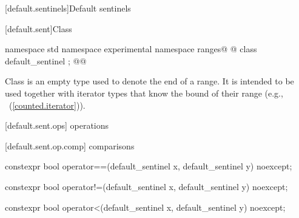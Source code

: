 \begin{addedblock}
[default.sentinels]{Default sentinels}

[default.sent]{Class }

%
\begin{itemdecl}
namespace std { namespace experimental { namespace ranges@ @ {
  class default_sentinel { };
}}}@\newtxt{\}}@
\end{itemdecl}

\pnum
Class  is an empty type used to denote the end of a
range. It is intended to be used together with iterator types that know the bound
of their range (e.g., ~(\ref{counted.iterator})).

{\color{oldclr}
[default.sent.ops]{ operations}

[default.sent.op.comp]{ comparisons}

%
%
\begin{itemdecl}
constexpr bool operator==(default_sentinel x, default_sentinel y) noexcept;
\end{itemdecl}

\begin{itemdescr}
\pnum
\returns {}
\end{itemdescr}

%
%
\begin{itemdecl}
constexpr bool operator!=(default_sentinel x, default_sentinel y) noexcept;
\end{itemdecl}

\begin{itemdescr}
\pnum
\returns {}
\end{itemdescr}

%
%
\begin{itemdecl}
constexpr bool operator<(default_sentinel x, default_sentinel y) noexcept;
\end{itemdecl}

\begin{itemdescr}
\pnum
\returns {}
\end{itemdescr}

}
\end{addedblock}
